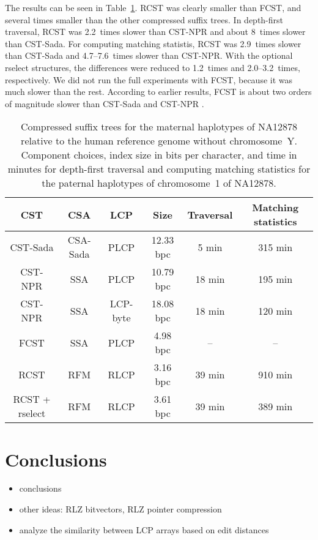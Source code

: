 \documentclass[a4paper,11pt]{llncs}
\newcommand{\CST}{\textsf{CST}}
\newcommand{\CSTsada}{\textsf{CST\nobreakdash-Sada}}
\newcommand{\FCST}{\textsf{FCST}}
\newcommand{\CSTnpr}{\textsf{CST\nobreakdash-NPR}}
\newcommand{\RCST}{\textsf{RCST}}
\newcommand{\CSA}{\textsf{CSA}}
\newcommand{\SSA}{\textsf{SSA}}
\newcommand{\CSAsada}{\textsf{CSA-Sada}}
\newcommand{\RFM}{\textsf{RFM}}
\newcommand{\LCP}{\textsf{LCP}}
\newcommand{\PLCP}{\textsf{PLCP}}
\newcommand{\RLCP}{\textsf{RLCP}}
\newcommand{\LCPbyte}{\textsf{LCP\nobreakdash-byte}}
\newcommand{\rselect}{\textsf{rselect}}
\begin{document}
The results can be seen in Table~\ref{table:cst}. \RCST{} was clearly smaller than \FCST, and several times smaller than the other compressed suffix trees. In depth-first traversal, \RCST{} was 2.2~times slower than \CSTnpr{} and about 8~times slower than \CSTsada. For computing matching statistis, \RCST{} was 2.9~times slower than \CSTsada{} and 4.7\nobreakdash--7.6~times slower than \CSTnpr{}. With the optional \rselect{} structures, the differences were reduced to 1.2~times and 2.0\nobreakdash--3.2~times, respectively. We did not run the full experiments with \FCST, because it was much slower than the rest. According to earlier results, \FCST{} is about two orders of magnitude slower than \CSTsada{} and \CSTnpr{} \cite{Abeliuk2013}.

\begin{table}
\caption{Compressed suffix trees for the maternal haplotypes of NA12878 relative to the human reference genome without chromosome~Y. Component choices, index size in bits per character, and time in minutes for depth-first traversal and computing matching statistics for the paternal haplotypes of chromosome~1 of NA12878.}\label{table:cst}
\setlength{\extrarowheight}{2pt}
\setlength{\tabcolsep}{3pt}
\begin{center}
\begin{tabular}{c|cc|c|c|c}
\hline
\textbf{\CST} & \textbf{\CSA} & \textbf{\LCP} & \textbf{Size} & \textbf{Traversal} & \textbf{Matching statistics} \\
\hline
\CSTsada           & \CSAsada & \PLCP    & 12.33 bpc &  5 min & 315 min \\
\CSTnpr            & \SSA     & \PLCP    & 10.79 bpc & 18 min & 195 min \\
\CSTnpr            & \SSA     & \LCPbyte & 18.08 bpc & 18 min & 120 min \\
\FCST              & \SSA     & \PLCP    &  4.98 bpc &     -- &      -- \\
\RCST              & \RFM     & \RLCP    &  3.16 bpc & 39 min & 910 min \\
\RCST{} + \rselect & \RFM     & \RLCP    &  3.61 bpc & 39 min & 389 min \\
\hline
\end{tabular}
\end{center}
\end{table}


\section{Conclusions}\label{section:conclusions}

\begin{itemize}
\item conclusions
\item other ideas: RLZ bitvectors, RLZ pointer compression
\item analyze the similarity between LCP arrays based on edit distances
\end{itemize}




\end{document}
